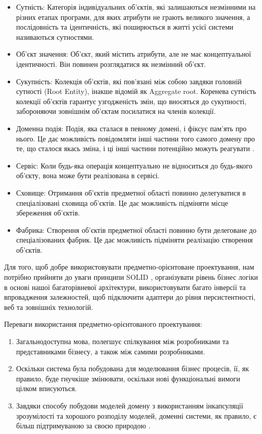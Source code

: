 \begin{itemize}
	\item Сутність: Категорія індивідуальних об'єктів,
		які залишаються незмінними на різних етапах програми,
		для яких атрибути не грають великого значення, а послідовність та ідентичність,
		які поширюється в житті усієї системи називаються сутностями.
	\item Об'єкт значення: Об'єкт, який містить атрибути,
		але не має концептуальної ідентичності. Він повинен розглядатися як незмінний об'єкт.
	\item Сукупність: Колекція об'єктів, які пов'язані між собою завдяки
		головній сутності (Root Entity), інакше відомій як Aggregate root.
		Коренева сутність колекції об'єктів гарантує узгодженість змін,
		що вносяться до сукупності, забороняючи зовнішнім об'єктам посилатися на членів колекції.
	\item Доменна подія: Подія, яка сталася в певному домені, і фіксує пам'ять про нього.
		Це дає можливість повідомляти інші частини того самого домену про те,
		що сталося якась зміна, і ці інші частини потенційно можуть реагувати \cite{de-article}.
	\item Сервіс: Коли будь-яка операція концептуально не відноситься до будь-якого об'єкту,
		вона може бути реалізована в сервісі.
	\item Сховище: Отримання об'єктів предметної області повинно делегуватися
		в спеціалізовані сховища об'єктів. Це дає можливість підміняти місце збереження об'єктів.
	\item Фабрика: Створення об'єктів предметної області повинно бути делеговане до
		спеціалізованих фабрик. Це дає можливість підміняти реалізацію створення об'єктів.
\end{itemize}

Для того, щоб добре використовувати предметно-орієнтоване проектування,
нам потрібно прийняти до уваги принципи SOLID \cite{solid-martin},
організувати рівень бізнес логіки в основі нашої багаторівневої архітектури,
використовувати багато інверсії та впровадження залежностей,
щоб підключити адаптери до рівня персистентності, веб та зовнішніх технологій.

Переваги використання предметно-орієнтованого проектування:

\begin{enumerate}
		\item Загальнодоступна мова, полегшує спілкування між
			розробниками та представниками бізнесу, а також між самими розробниками.
		\item Оскільки система була побудована для моделювання бізнес процесів,
			її, як правило, буде гнучкіше змінювати,
			оскільки нові функціональні вимоги цілком вписуються.
		\item Завдяки способу побудови моделей домену з використанням
      інкапсуляції зрозумілості та хорошого розподілу моделей,
      доменні системи, як правило, є більш підтримуваною за
      своєю природою \cite{ddd-pros-cons}.
\end{enumerate}

